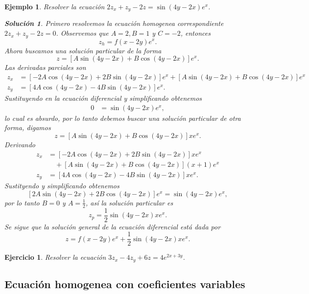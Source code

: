 \documentclass[11pt,letterpaper]{report}
\newtheorem{example}[defn]{Ejemplo}
\newtheorem{exe}[defn]{Ejercicio}
\newtheorem*{sol}{Solución}
\newcommand\<{\langle}
\renewcommand\>{\rangle}
\begin{document}
\begin{example}
  Resolver la ecuación $2z_x + z_y - 2z = \sin(4y-2x)e^{x}$.

  \begin{sol}
    Primero resolvemos la ecuación homogenea correspondiente
    $2z_x + z_y - 2z = 0$. Observemos que $A = 2, B = 1$ y
    $C = -2$, entonces
     \[
      z_h = f(x-2y)e^{x}
    .\] 
    Ahora buscamos una solución particular de la forma
    \[
      z = [A \sin(4y-2x) + B \cos(4y-2x)]e^{x}
    .\] Las derivadas parciales son
    \begin{align*}
      z_x &= [-2A\cos(4y-2x) + 2B\sin(4y-2x)]e^{x} +
      [A\sin(4y-2x) + B\cos(4y-2x)]e^{x}\\
      z_y &= [4A\cos(4y-2x) - 4B\sin(4y-2x)]e^{x}.
    \end{align*}
    Sustituyendo en la ecuación diferencial y simplificando
    obtenemos
    \begin{align*}
      0 &= \sin(4y-2x)e^{x},
    \end{align*}
    lo cual es absurdo, por lo tanto debemos buscar una
    solución particular de otra forma, digamos
    \[
    z = [A\sin(4y-2x) + B\cos(4y-2x)]x e^{x}
    .\] Derivando
    \begin{align*}
      z_x &= [-2A\cos(4y-2x) + 2B\sin(4y-2x)]xe^{x}\\
          &\quad+ [A\sin(4y-2x)+B\cos(4y-2x)](x+1)e^{x}\\
      z_y &= [4A\cos(4y-2x) - 4B\sin(4y-2x)]xe^{x}.
    \end{align*}
    Sustityendo y simplificando obtenemos
    \[
      [2A\sin(4y-2x) + 2B\cos(4y-2x)]e^{x} = \sin(4y-2x)e^{x}
    ,\] 
    por lo tanto $B = 0$ y $A = \frac{1}{2}$, así la
    solución particular es
    \[
    z_p = \frac{1}{2}\sin(4y-2x)xe^{x}
    .\]
    Se sigue que la solución general de la ecuación
    diferencial está dada por
    \[
    z = f(x-2y)e^{x} + \frac{1}{2}\sin(4y-2x)xe^{x}
    .\] 
  \end{sol}
\end{example}

\begin{exe}
  Resolver la ecuación $3z_x - 4z_y + 6z = 4e^{2x+3y}$.
\end{exe}

\subsection{Ecuación homogenea con coeficientes variables}
\end{document}
